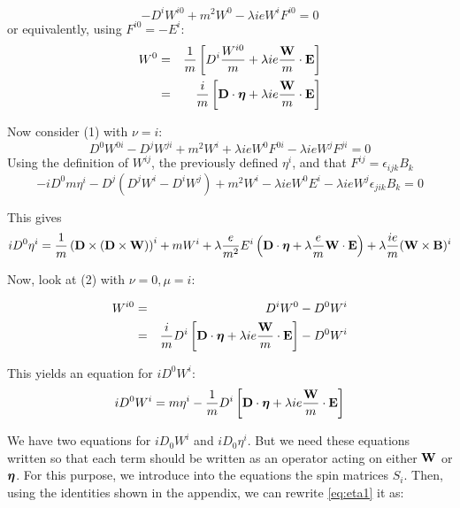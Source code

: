 \begin{equation*}
-D^i W ^{i0} + m^2 W^0 - \lambda i e W^{i} F^{i0} = 0
\end{equation*}
or equivalently, using $F^{i0} = -E^i$:
\begin{eqnarray*}
W^0	&=&	\frac{1}{m} \left [ D^i \frac{W^{i0}}{m} + \lambda ie \frac{\mathbf{W}}{m} \cdot \mathbf{E}  \right ]	\\
	&=&	\frac{i}{m} \left [ \mathbf{D} \cdot \mbox{\boldmath$ \eta $} + \lambda ie \frac{\mathbf{W}}{m} \cdot \mathbf{E}  \right ]
\end{eqnarray*}


Now consider (1) with $\nu=i$:
\begin{equation*}
D^0 W^{0i} - D^j W^{ji} + m^2 W^{i} + \lambda ieW^0 F^{0i} - \lambda ieW^{j} F^{ji} = 0
\end{equation*}
Using the definition of $W^{ij}$, the previously defined $\eta^i$, and that $F^{ij} = \epsilon_{ijk} B_k$
\begin{equation*}
-i D^0 m \eta^i - D^j (D^j W^i - D^i W^j) + m^2 W^i - \lambda ieW^0 E^i  - \lambda ieW^{j} \epsilon_{jik} B_k = 0
\end{equation*}

This gives
\begin{equation} \label{eq:eta1}
iD^0 \eta^i = \frac{1}{m} \left (\mathbf{D} \times (\mathbf{D} \times \mathbf{W}) \right)^i + m W^i + \lambda\frac{e}{m^2} E^i \left( \mathbf{D} \cdot \mbox{\boldmath$ \eta $} + \lambda \frac{e}{m} \mathbf{W} \cdot \mathbf{E} \right) + \lambda \frac{ie}{m} (\mathbf{W} \times \mathbf{B} )^i
\end{equation}

Now, look at (2) with $\nu=0, \mu=i$:

\begin{eqnarray*}
W^{i0} 
	&=& 	D^i W^0 - D^0 W^i		\\
	&=&	 \frac{i}{m} D^i \left [ \mathbf{D} \cdot \mbox{\boldmath$ \eta $} + \lambda ie \frac{\mathbf{W}}{m} \cdot \mathbf{E}  \right ] - D^0 W^i
\end{eqnarray*}

This yields an equation for $iD^0 W^i$:
\begin{equation}\label{eq:W1}
i D^0 W^i = 
	m \eta^i - \frac{1}{m} D^i \left [ \mathbf{D} \cdot \mbox{\boldmath$ \eta $} + \lambda ie \frac{\mathbf{W}}{m} \cdot \mathbf{E}  \right ]
\end{equation}

We have two equations for $i D_0 W^i$ and $i D_0 \eta^i$.  But we need these equations written so that each term should be written as an operator acting on either $\mathbf{W}$ or $\mbox{\boldmath$ \eta $}$. For this purpose, we introduce into the equations the spin matrices $S_i$.  Then, using the identities shown in the appendix, we can rewrite \eqref{eq:eta1} it as:

